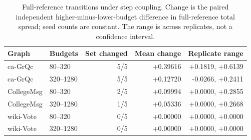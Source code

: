 \begin{table}[htbp]
\caption{Full-reference transitions under step coupling. Change is the paired independent higher-minus-lower-budget difference in full-reference total spread; seed counts are constant. The range is across replicates, not a confidence interval.}\label{tab:transitions}
\begin{tabular}{llrrr}
\toprule
Graph & Budgets & Set changed & Mean change & Replicate range \\
\midrule
ca-GrQc & 80--320 & 5/5 & +0.39616 & +0.1819, +0.6139 \\
ca-GrQc & 320--1280 & 5/5 & +0.12720 & -0.0266, +0.2411 \\
CollegeMsg & 80--320 & 2/5 & +0.09994 & +0.0000, +0.2855 \\
CollegeMsg & 320--1280 & 1/5 & +0.05336 & +0.0000, +0.2668 \\
wiki-Vote & 80--320 & 0/5 & +0.00000 & +0.0000, +0.0000 \\
wiki-Vote & 320--1280 & 0/5 & +0.00000 & +0.0000, +0.0000 \\
\bottomrule
\end{tabular}
\end{table}
